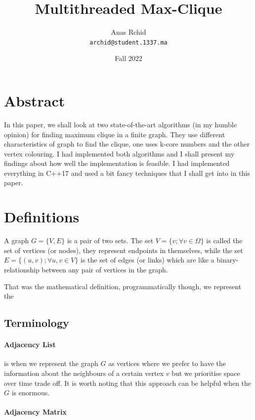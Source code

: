 \documentclass[•]{article}
\title{Multithreaded Max-Clique}
\author{Anas Rchid\\ \texttt{archid@student.1337.ma}}
\date{Fall 2022}
\begin{document}
\maketitle

\section*{Abstract}
In this paper, we shall look at two state-of-the-art algorithms (in my humble opinion) for finding maximum clique in a finite graph. They use different characteristics of graph to find the clique, one uses k-core numbers and the other vertex colouring. I had implemented both algorithms and I shall present my findings about how well the implementation is feasible. I had implemented everything in C++17 and used a bit fancy techniques that I shall get into in this paper.

\section{Definitions}

\begin{definition}
  A graph $G = \{V, E\}$ is a pair of two sets. The set $V = \{v ; \forall v \in \Omega\}$ is called the set of vertices (or nodes), they represent endpoints in themselves, while the set $E = \{( u,v); \forall u, v \in V\}$ is the set of edges (or links) which are like a binary-relationship between any pair of vertices in the graph.

\end{definition}
That was the mathematical definition, programmatically though, we represent the

\subsection{Terminology}

\paragraph{Adjacency List} is when we represent the graph $G$ as vertices where we prefer to have the information about the neighbours of a certain vertex $v$ but we prioritise space over time trade off.  It is worth noting that this approach can be helpful when the $G$ is enormous.

\paragraph{Adjacency Matrix}
\end{document}
